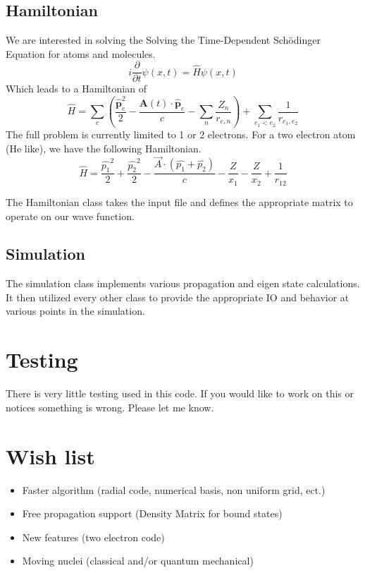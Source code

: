 \documentclass{article}
\begin{document}
\subsection{Hamiltonian} %
\label{sub:hamiltonian}
We are interested in solving the Solving the Time-Dependent Sch\"{o}dinger Equation for atoms and molecules.
\begin{equation}
    i\frac{\partial}{\partial t}\psi(x,t) = \hat{H}\psi(x,t)
\end{equation}
Which leads to a Hamiltonian of
\begin{equation}
    \hat{H} = \sum_{e}\left(\frac{\hat{\mathbf{p}}^2_e}{2} - \frac{\mathbf{A}(t) \cdot \hat{\mathbf{p}}_e}{c} - \sum_{n} \frac{Z_n}{r_{e,n}}\right) + \sum_{e_1 < e_2}\frac{1}{r_{e_1, e_2}}
\end{equation}
The full problem is currently limited to 1 or 2 electrons. For a two electron atom (He like), we have the following Hamiltonian.
\begin{equation}
  \hat H = \frac{\hat{p_1}^2}{2} + \frac{\hat{p_2}^2}{2} - \frac{\vec{A} \cdot (\hat{p_1}+\hat{p_2})}{c} - \frac{Z}{x_1} - \frac{Z}{x_2} + \frac{1}{r_{12}}
\end{equation}

The Hamiltonian class takes the input file and defines the appropriate matrix to operate on our wave function.


\subsection{Simulation} %
\label{sub:simulation}
The simulation class implements various propagation and eigen state calculations. It then utilized every other class to provide the appropriate IO and behavior at various points in the simulation.



\section{Testing} %
\label{sec:testing}
There is very little testing used in this code. If you would like to work on this or notices something is wrong. Please let me know.

\section{Wish list} %
\label{sec:wish_list}
\begin{itemize}
    \item Faster algorithm (radial code, numerical basis, non uniform grid, ect.)
    \item Free propagation support (Density Matrix for bound states)
    \item New features (two electron code)
    \item Moving nuclei (classical and/or quantum mechanical)
\end{itemize}
\end{document}
